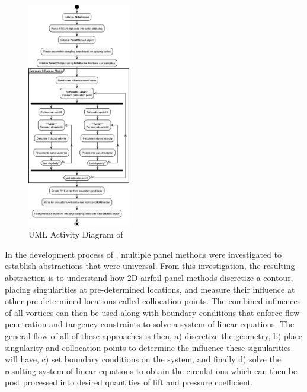 \begin{figure}
    \vspace{-2em}
    \begin{center}
      \includegraphics[width=0.40\textwidth]{static/activity_diagram.pdf}
    \end{center}
    \caption{UML Activity Diagram of \numfoil}
    \label{fig:activity}
\end{figure}

In the development process of \numfoil, multiple panel methods were
investigated to establish abstractions that were universal. From this
investigation, the resulting abstraction is to understand how 2D airfoil panel
methods discretize a contour, placing singularities at pre-determined
locations, and measure their influence at other pre-determined locations called
collocation points. The combined influences of all vortices can then be used
along with boundary conditions that enforce flow penetration and tangency
constraints to solve a system of linear equations. The general flow of all of
these approaches is then, a) discretize the geometry, b) place singularity and
collocation points to determine the influence these signularities will have, c)
set boundary conditions on the system, and finally d) solve the resulting
system of linear equations to obtain the circulations which can then be post
processed into desired quantities of lift and pressure coefficient.\\

